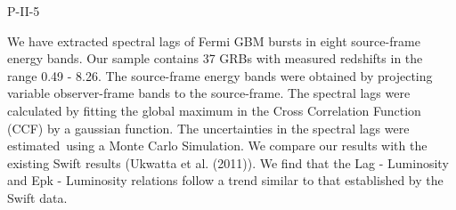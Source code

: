 P-II-5


\bigskip



\bigskip

\noindent We have extracted spectral lags of Fermi GBM bursts in eight source-frame energy bands. Our sample contains 37 GRBs with measured redshifts in the range 0.49 - 8.26. The source-frame energy bands were obtained by projecting variable observer-frame bands to the source-frame. The spectral lags were calculated by fitting the global maximum in the Cross Correlation Function (CCF) by a gaussian function. The uncertainties in the spectral lags were estimated using a Monte Carlo Simulation. We compare our results with the existing Swift results (Ukwatta et al. (2011)). We find that the Lag - Luminosity and Epk - Luminosity relations follow a trend similar to that established by the Swift data. 
